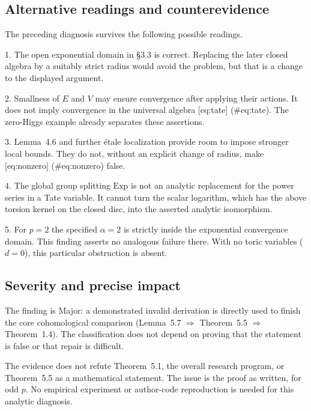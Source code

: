 \documentclass[10pt]{article}
\begin{document}
\subsection*{Alternative readings and counterevidence}
The preceding diagnosis survives the following possible readings.\par
1. The open exponential domain in §3.3 is correct. Replacing the later closed algebra by a suitably strict radius would avoid the problem, but that is a change to the displayed argument.\par
2. Smallness of \(E\) and \(V\) may ensure convergence after applying their actions. It does not imply convergence in the universal algebra [eq:tate] (\#eq:tate). The zero-Higgs example already separates these assertions.\par
3. Lemma 4.6 and further étale localization provide room to impose stronger local bounds. They do not, without an explicit change of radius, make [eq:nonzero] (\#eq:nonzero) false.\par
4. The global group splitting \(\mathrm{Exp}\) is not an analytic replacement for the power series in a Tate variable. It cannot turn the scalar logarithm, which has the above torsion kernel on the closed disc, into the asserted analytic isomorphism.\par
5. For \(p=2\) the specified \(\alpha=2\) is strictly inside the exponential convergence domain. This finding asserts no analogous failure there. With no toric variables (\(d=0\)), this particular obstruction is absent.\par
\subsection*{Severity and precise impact}
The finding is Major: a demonstrated invalid derivation is directly used to finish the core cohomological comparison (Lemma 5.7 \(\Rightarrow\) Theorem 5.5 \(\Rightarrow\) Theorem 1.4). The classification does not depend on proving that the statement is false or that repair is difficult.\par
The evidence does not refute Theorem 5.1, the overall research program, or Theorem 5.5 as a mathematical statement. The issue is the proof as written, for odd \(p\). No empirical experiment or author-code reproduction is needed for this analytic diagnosis.\par
\end{document}
